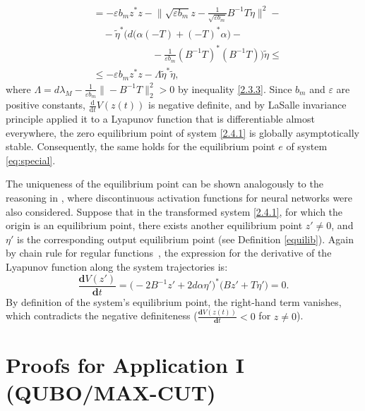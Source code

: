 \documentclass[journal]{IEEEtran}
\theoremstyle{myplain}
\begin{document}
\begin{IEEEproof}
\begin{equation*}
\begin{aligned}
&=-\varepsilon b_m z^{*}z -\bigg\|\sqrt{\varepsilon b_m} z - \frac{1}{\sqrt{\varepsilon b_m}} B^{-1}T \widetilde{\eta} \bigg\|^2-\\
& \quad- \widetilde{\eta}^{*}\bigg(d \big(\alpha(-T)+(-T)^{*}\alpha\big) - \\&~~~~~~~~~~~~~~~~~~~~~~~~~~~-\frac{1}{\varepsilon b_m}(B^{-1}T)^{*}(B^{-1}T)\bigg) \widetilde{\eta} \leqslant\\
& \leqslant-\varepsilon b_m z^{*}z - \Lambda \widetilde{\eta}^{*}\widetilde{\eta},
\end{aligned} 
\end{equation*}
where $\Lambda = d \lambda_M - \frac{1}{\varepsilon b_m}\|-B^{-1}T\|^2_2>0$ by inequality \eqref{2.3.3}. Since $b_m$ and $\varepsilon$ are positive constants, $\frac{\mathrm{d}}{\mathrm{d} t} V(z(t))$ is negative definite, and by LaSalle invariance principle \cite[Cor. 4.2, p. 129]{p223} applied it to a Lyapunov function that is differentiable almost everywhere, the zero equilibrium point of system \eqref{2.4.1} is globally asymptotically stable. Consequently, the same holds for the equilibrium point $e$ of system \eqref{eq:special}. 

The uniqueness of the equilibrium point can be shown analogously to the reasoning in \cite{eq_ref_11, periodic_time_varying, eq_ref_2}, where discontinuous activation functions for neural networks were also considered. Suppose that in the transformed system \eqref{2.4.1}, for which the origin is an equilibrium point, there exists another equilibrium point $z' \ne 0$, and $\eta'$ is the corresponding output equilibrium point (see Definition \ref{equilib}). Again by chain rule for regular functions~\cite{ShevitzPaden1994}, the expression for the derivative of the Lyapunov function along the system trajectories is:
\[
\frac{\mathbf{d}V(z')}{\mathbf{d}t} = \big(-2B^{-1}z'+2d\alpha {\eta'}\big)^{*}\big(Bz'+T {\eta}') = 0 .
\]
By definition of the system's equilibrium point, the right-hand term vanishes, which contradicts the negative definiteness ($\frac{\mathbf{d}V(z(t))}{\mathbf{d}t} < 0 $ for $z \ne 0$).
\end{IEEEproof}

\section{Proofs for Application I (QUBO/MAX-CUT)}\label{app:qubo-proofs}
\end{document}
